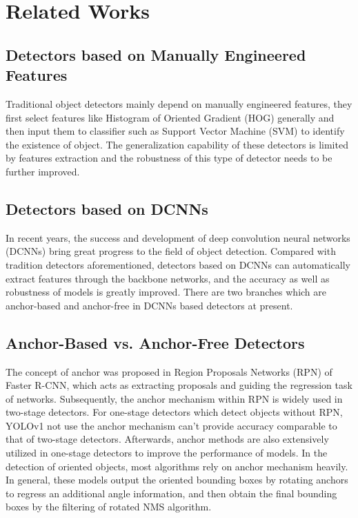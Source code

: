 \documentclass[runningheads]{llncs}
\begin{document}
\section{Related Works} \label{section:2}

\subsection{Detectors based on Manually Engineered Features}

Traditional object detectors mainly depend on manually engineered features, they first select features like Histogram of Oriented Gradient (HOG)\cite{dalal2005histograms} generally and then input them to classifier such as Support Vector Machine (SVM)\cite{cortes1995support} to identify the existence of object.  The generalization capability of these detectors is limited by features extraction and the robustness of this type of detector needs to be further improved. 

\subsection{Detectors based on DCNNs}

In recent years, the success and development of deep convolution neural networks (DCNNs)\cite{lecun1998gradient,krizhevsky2012imagenet} bring great progress to the field of object detection. Compared with tradition detectors aforementioned, detectors based on DCNNs \cite{ren2015faster,law2018cornernet,zhou2019bottom,tian2019fcos,zhou2019objects,redmon2016you,redmon2017yolo9000,liu2016ssd} can automatically extract features through the backbone networks\cite{simonyan2014very,he2016deep}, and the accuracy as well as robustness of models is greatly improved. There are two branches which are anchor-based and anchor-free in DCNNs based detectors at present.

\subsection{Anchor-Based vs. Anchor-Free Detectors}

The concept of anchor was proposed in Region Proposals Networks (RPN) of Faster R-CNN\cite{ren2015faster}, which acts as extracting proposals and guiding the regression task of networks. Subsequently, the anchor mechanism within RPN is widely used in two-stage detectors\cite{jiang2017r2cnn,ma2018arbitrary,yang2019scrdet,cai2018cascade}. For one-stage detectors which detect objects\cite{redmon2016you,redmon2017yolo9000,liu2016ssd,lin2017focal} without RPN, YOLOv1\cite{redmon2016you} not use the anchor mechanism can't provide accuracy comparable to that of two-stage detectors. Afterwards, anchor methods are also extensively utilized in one-stage detectors\cite{redmon2017yolo9000,liu2016ssd,lin2017focal} to improve the performance of models. In the detection of oriented objects, most algorithms rely on anchor mechanism heavily. In general, these models output the oriented bounding boxes by rotating anchors to regress an additional angle information, and then obtain the final bounding boxes by the filtering of rotated NMS algorithm.  
\end{document}
